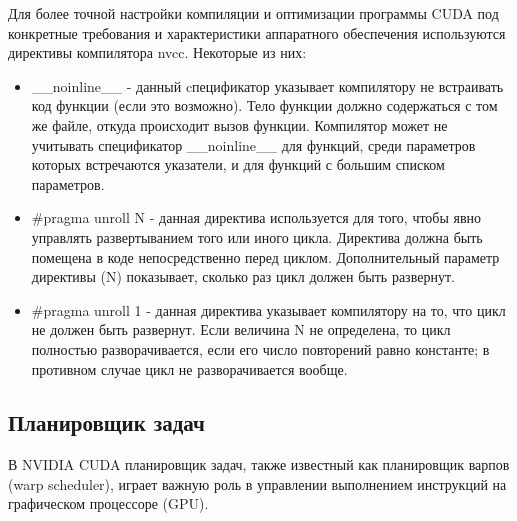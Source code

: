 \documentclass[a4paper, 12pt]{article}
\begin{document}
    Для более точной настройки компиляции и оптимизации программы CUDA под конкретные требования и характеристики аппаратного обеспечения используются директивы компилятора nvcc. Некоторые из них:
    \begin{itemize}
        \item \_\_noinline\_\_ - данный cпецификатор указывает компилятору не встраивать код функции (если это возможно). Тело функции должно содержаться с том же файле, откуда происходит вызов функции. Компилятор может не учитывать спецификатор \_\_noinline\_\_ для функций, среди параметров которых встречаются указатели, и для функций с большим списком параметров.
        \item \#pragma unroll N - данная директива используется для того, чтобы явно управлять развертыванием того или иного цикла. Директива должна быть помещена в коде непосредственно перед циклом. Дополнительный параметр директивы (N) показывает, сколько раз цикл должен быть развернут.
        \item \#pragma unroll 1 - данная директива указывает компилятору на то, что цикл не должен быть развернут. Если величина N не определена, то цикл полностью разворачивается, если его число повторений равно константе; в противном случае цикл не разворачивается вообще. 
    \end{itemize}
    \subsection{Планировщик задач}
    В NVIDIA CUDA планировщик задач, также известный как планировщик варпов (warp scheduler), играет важную роль в управлении выполнением инструкций на графическом процессоре (GPU). 
    
\end{document}
